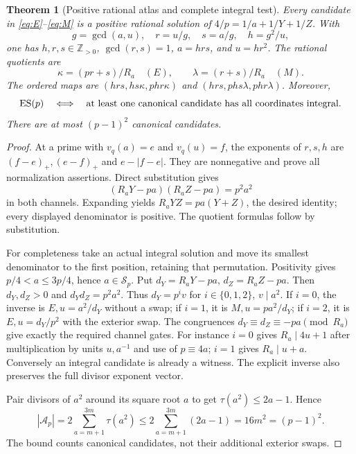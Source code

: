 \documentclass[11pt]{article}
\newtheorem{theorem}{Theorem}[section]
\theoremstyle{definition}\newtheorem{definition}[theorem]{Definition}
\theoremstyle{remark}\newtheorem{remark}[theorem]{Remark}
\newcommand{\Z}{\mathbb Z}\newcommand{\Q}{\mathbb Q}\newcommand{\R}{\mathbb R}
\begin{document}
\begin{theorem}[Positive rational atlas and complete integral test]\label{thm:atlas}
Every candidate in \eqref{eq:E}--\eqref{eq:M} is a positive rational
solution of $4/p=1/a+1/Y+1/Z$. With
\[
 g=\gcd(a,u),\quad r=u/g,\quad s=a/g,\quad h=g^2/u,
\]
one has $h,r,s\in\Z_{>0}$, $\gcd(r,s)=1$, $a=hrs$, and $u=hr^2$.
The rational quotients are
\[
 \kappa=(pr+s)/R_a\quad(E),\qquad
 \lambda=(r+s)/R_a\quad(M).
\]
The ordered maps are $(hrs,hs\kappa,phr\kappa)$ and
$(hrs,phs\lambda,phr\lambda)$. Moreover,
\[
 \operatorname{ES}(p)\quad\Longleftrightarrow\quad
 \text{at least one canonical candidate has all coordinates integral}.
\]
There are at most $(p-1)^2$ canonical candidates.
\end{theorem}
\begin{proof}
At a prime with $v_q(a)=e$ and $v_q(u)=f$, the exponents of
$r,s,h$ are $(f-e)_+,(e-f)_+$ and $e-|f-e|$. They are nonnegative
and prove all normalization assertions. Direct substitution gives
\[
 (R_aY-pa)(R_aZ-pa)=p^2a^2
\]
in both channels. Expanding yields
$R_aYZ=pa(Y+Z)$, the desired identity; every displayed denominator is
positive. The quotient formulas follow by substitution.

For completeness take an actual integral solution and move its smallest
denominator to the first position, retaining that permutation.
Positivity gives $p/4<a\le3p/4$, hence $a\in\mathcal S_p$.
Put $d_Y=R_aY-pa$, $d_Z=R_aZ-pa$. Then $d_Y,d_Z>0$ and
$d_Yd_Z=p^2a^2$. Thus $d_Y=p^iv$ for $i\in\{0,1,2\}$,
$v\mid a^2$. If $i=0$, the inverse is $E,u=a^2/d_Y$ without a swap;
if $i=1$, it is $M,u=pa^2/d_Y$; if $i=2$, it is
$E,u=d_Y/p^2$ with the exterior swap. The congruences
$d_Y\equiv d_Z\equiv-pa\pmod{R_a}$ give exactly the required channel
gates. For instance $i=0$ gives $R_a\mid4u+1$ after multiplication by
units $u,a^{-1}$ and use of $p\equiv4a$; $i=1$ gives
$R_a\mid u+a$. Conversely an integral candidate is already a witness.
The explicit inverse also preserves the full divisor exponent vector.

Pair divisors of $a^2$ around its square root $a$ to get
$\tau(a^2)\le2a-1$. Hence
\[
 |\mathscr A_p|=2\sum_{a=m+1}^{3m}\tau(a^2)
 \le2\sum_{a=m+1}^{3m}(2a-1)=16m^2=(p-1)^2.
\]
The bound counts canonical candidates, not their additional exterior swaps.
\end{proof}
\end{document}
